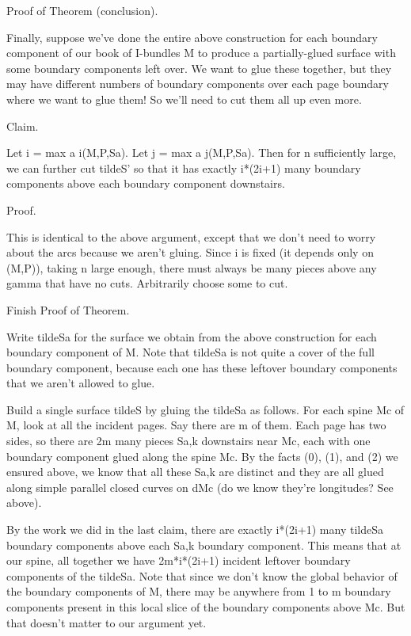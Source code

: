 \documentclass[12pt]{amsart}
\theoremstyle{definition}
\theoremstyle{remark}
\begin{document}

Proof of Theorem (conclusion).

Finally, suppose we've done the entire above construction for each boundary
component of our book of I-bundles M to produce a partially-glued surface with
some boundary components left over. We want to glue these together, but they
may have different numbers of boundary components over each page boundary where
we want to glue them! So we'll need to cut them all up even more.

Claim.

Let i = max a i(M,P,Sa). Let j = max a j(M,P,Sa). Then for n sufficiently
large, we can further cut tildeS' so that it has exactly i*(2i+1) many boundary
components above each boundary component downstairs.

Proof.

This is identical to the above argument, except that we don't need to worry
about the arcs because we aren't gluing. Since i is fixed (it depends only on
(M,P)), taking n large enough, there must always be many pieces above any gamma
that have no cuts.  Arbitrarily choose some to cut.

Finish Proof of Theorem.

Write tildeSa for the surface we obtain from the above construction for each
boundary component of M. Note that tildeSa is not quite a cover of the full
boundary component, because each one has these leftover boundary components
that we aren't allowed to glue.

Build a single surface tildeS by gluing the tildeSa as follows. For each spine
Mc of M, look at all the incident pages. Say there are m of them. Each page has
two sides, so there are 2m many pieces Sa,k downstairs near Mc, each with one
boundary component glued along the spine Mc. By the facts (0), (1), and (2) we
ensured above, we know that all these Sa,k are distinct and they are all glued
along simple parallel closed curves on dMc (do we know they're longitudes?  See
above).

By the work we did in the last claim, there are exactly i*(2i+1) many tildeSa
boundary components above each Sa,k boundary component. This means that at our
spine, all together we have 2m*i*(2i+1) incident leftover boundary components
of the tildeSa. Note that since we don't know the global behavior of the
boundary components of M, there may be anywhere from 1 to m boundary components
present in this local slice of the boundary components above Mc. But that
doesn't matter to our argument yet.
\end{document}
